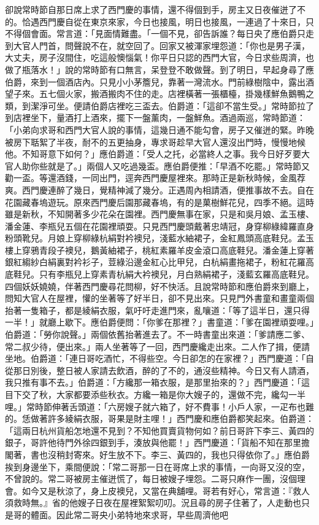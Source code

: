 卻說常時節自那日席上求了西門慶的事情，還不得個到手，房主又日夜催迸了不的。恰遇西門慶自從在東京來家，今日也接風，明日也接風，一連過了十來日，只不得個會面。常言道：「見面情難盡。「一個不見，卻告訴誰？每日央了應伯爵只走到大官人門首，問聲說不在，就空回了。回家又被渾家埋怨道：「你也是男子漢，大丈夫，房子沒間住，吃這般懊惱氣！你平日只認的西門大官，今日求些周濟，也做了瓶落水！」說的常時節有口無言，呆登登不敢做聲。到了明日，早起身尋了應伯爵，來到一個酒店內。只見小小茅簷兒，靠著一灣流水。門前綠樹陰中，露出酒望子來。五七個火家，搬酒搬肉不住的走。店裡橫著一張櫃檯，掛幾樣鮮魚鵝鴨之類，到潔淨可坐。便請伯爵店裡吃三盃去。伯爵道：「這卻不當生受。」常時節拉了到店裡坐下，量酒打上酒來，擺下一盤薰肉，一盤鮮魚。酒過兩巡，常時節道：「小弟向求哥和西門大官人說的事情，這幾日通不能勾會，房子又催迸的緊。昨晚被房下聒絮了半夜，耐不的五更抽身，專求哥趁早大官人還沒出門時，慢慢地候他。不知哥意下如何？」應伯爵道：「受人之托，必當終人之事。我今日好歹要大官人助你些就是了。」兩個人又吃過幾盃。應伯爵便推：「早酒不吃罷。」常時節又勸一盃。等還酒錢，一同出門，逕奔西門慶屋裡來。那時正是新秋時候，金風荐爽。西門慶連醉了幾日，覺精神減了幾分。正遇周內相請酒，便推事故不去。自在花園藏春塢遊玩。原來西門慶后園那藏春塢，有的是菓樹鮮花兒，四季不絕。這時雖是新秋，不知開著多少花朵在園裡。西門慶無事在家，只是和吳月娘、孟玉樓、潘金蓮、李瓶兒五個在花園裡頑耍。只見西門慶頭戴著忠靖冠，身穿柳綠緯羅直身粉頭靴兒。月娘上穿柳綠杭絹對衿襖兒，淺藍水紬裙子，金紅鳳頭高底鞋兒。孟玉樓上穿鴉青段子襖兒，鵝黃紬裙子，桃紅素羅羊皮金滾口高底鞋兒。潘金蓮上穿著銀紅縐紗白絹裏對衿衫子，荳綠沿邊金紅心比甲兒，白杭絹畫拖裙子，粉紅花羅高底鞋兒。只有李瓶兒上穿素青杭絹大衿襖兒，月白熟絹裙子，淺藍玄羅高底鞋兒。四個妖妖嬈嬈，伴著西門慶尋花問柳，好不快活。且說常時節和應伯爵來到廳上，問知大官人在屋裡，懽的坐著等了好半日，卻不見出來。只見門外書童和畫童兩個抬著一隻箱子，都是綾絹衣服，氣吁吁走進門來，亂嚷道：「等了這半日，還只得一半！」就廳上歇下。應伯爵便問：「你爹在那裡？」書童道：「爹在園裡頑耍哩。」伯爵道：「勞你說聲。」兩個依舊抬著進去了。不一時書童出來道：「爹請應二爹、常二叔少待，便出來。」兩人坐著等了一回，西門慶纔走出來。二人作了揖，便請坐地。伯爵道：「連日哥吃酒忙，不得些空。今日卻怎的在家裡？」西門慶道：「自從那日別後，整日被人家請去飲酒，醉的了不的，通沒些精神。今日又有人請酒，我只推有事不去。」伯爵道：「方纔那一箱衣服，是那里抬來的？」西門慶道：「這目下交了秋，大家都要添些秋衣。方纔一箱是你大嫂子的，還做不完，纔勾一半哩。」常時節伸著舌頭道：「六房嫂子就六箱了，好不費事！小戶人家，一疋布也難的。恁做著許多綾絹衣服，哥果是財主哩！」西門慶和應伯爵都笑起來。伯爵道：「這兩日杭州貨船怎地還不見到？不知他買賣貨物何如？前日哥許下李三、黃四的銀子，哥許他待門外徐四銀到手，湊放與他罷！」西門慶道：「貨船不知在那里擔閣著，書也沒稍封寄來。好生放不下。李三、黃四的，我也只得依你了。」應伯爵挨到身邊坐下，乘間便說：「常二哥那一日在哥席上求的事情，一向哥又沒的空，不曾說的。常二哥被房主催迸慌了，每日被嫂子埋怨。二哥只麻作一團，沒個理會。如今又是秋涼了，身上皮襖兒，又當在典舖哩。哥若有好心，常言道：『救人須救時無。』省的他嫂子日夜在屋裡絮絮叨叨。況且尋的房子住著了，人走動也只是哥的體面。因此常二哥央小弟特地來求哥，早些周濟他吧